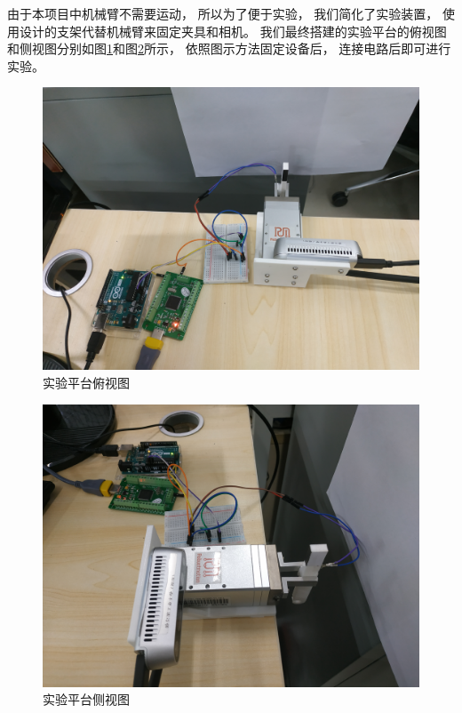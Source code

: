由于本项目中机械臂不需要运动， 所以为了便于实验， 我们简化了实验装置，
使用设计的支架代替机械臂来固定夹具和相机。
我们最终搭建的实验平台的俯视图和侧视图分别如图\ref{fig:exp-1}和图\ref{fig:exp-2}所示，
依照图示方法固定设备后， 连接电路后即可进行实验。

\begin{figure}[!ht]
  \centering
  \includegraphics[width=11.3cm]{chapter04/pic/exp-1}
  \caption{\label{fig:exp-1}
    实验平台俯视图}
  \vspace{-0.3cm}
\end{figure}

\begin{figure}[!ht]
  \centering
  \includegraphics[width=11.3cm]{chapter04/pic/exp-2}
  \caption{\label{fig:exp-2}
    实验平台侧视图}
  \vspace{-0.3cm}
\end{figure}


